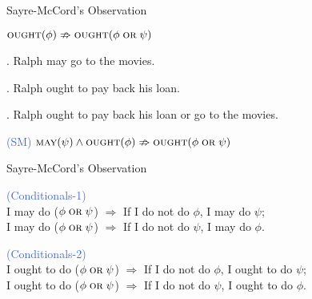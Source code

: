 \documentclass[xcolor=dvipsnames]{beamer}
\newcommand{\dor}{\mathrel{\text{\sc{or}}}}
\newcommand{\May}{\mathop{\text{\sc{may}}}}
\newcommand{\Ought}{\mathop{\text{\sc{ought}}}}
\begin{document}
    
    
\begin{frame}{Sayre-McCord's Observation}
  
\begin{center}
$\Ought(\phi) \nRightarrow \Ought(\phi \dor \psi)$
\end{center}
\vspace{10pt}
%
\cite{Enderton:1972}
\pause
\ex. Ralph may go to the movies.

\pause

\ex. Ralph ought to pay back his loan. 

\pause

\ex. Ralph ought to pay back his loan or go to the movies.

\pause

\vspace{10pt}
\begin{center}
  \textcolor{RoyalBlue}{(SM)} $\May(\psi) \wedge \Ought(\phi) \nRightarrow \Ought(\phi \dor \psi)$
\end{center}

\end{frame}

\begin{frame}{Sayre-McCord's Observation}
\begin{center}
  \textcolor{RoyalBlue}{(Conditionals-1)}\\ I may do ($\phi \dor \psi$) $\Rightarrow$ If I do not do $\phi$, I may do $\psi$; \\ 
  
  I may do ($\phi \dor \psi$) $\Rightarrow$ If I do not do $\psi$, I may do $\phi$. 
  \pause
  \vspace{30 pt}
 
 \textcolor{RoyalBlue}{(Conditionals-2)}\\ I ought to do ($\phi \dor \psi$) $\Rightarrow$ If I do not do $\phi$, I ought to do $\psi$; \\ 
  
  I ought to do ($\phi \dor \psi$) $\Rightarrow$ If I do not do $\psi$, I ought to do $\phi$. 
  
\end{center}
\end{frame}
\end{document}

